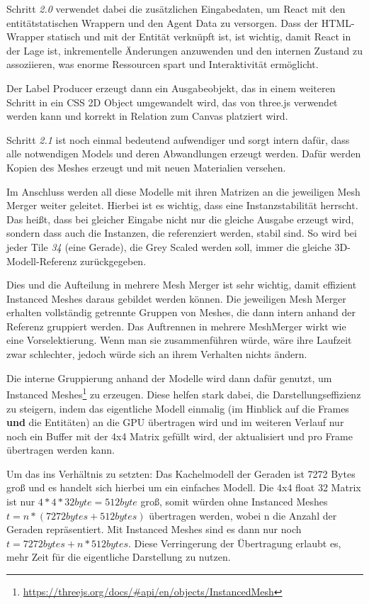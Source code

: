 Schritt \textit{2.0} verwendet dabei die zusätzlichen Eingabedaten, um React mit den entitätstatischen Wrappern und den Agent Data zu versorgen.
Dass der HTML-Wrapper statisch und mit der Entität verknüpft ist, ist wichtig, damit React in der Lage ist, inkrementelle Änderungen anzuwenden und den internen Zustand zu assoziieren, was enorme Ressourcen spart und Interaktivität ermöglicht.

Der Label Producer erzeugt dann ein Ausgabeobjekt, das in einem weiteren Schritt in ein CSS 2D Object umgewandelt wird, das von three.js verwendet werden kann und korrekt in Relation zum Canvas platziert wird.

Schritt \textit{2.1} ist noch einmal bedeutend aufwendiger und sorgt intern dafür, dass alle notwendigen Models und deren Abwandlungen erzeugt werden.
Dafür werden Kopien des Meshes erzeugt und mit neuen Materialien versehen.

Im Anschluss werden all diese Modelle mit ihren Matrizen an die jeweiligen Mesh Merger weiter geleitet.
Hierbei ist es wichtig, dass eine Instanzstabilität herrscht.
Das heißt, dass bei gleicher Eingabe nicht nur die gleiche Ausgabe erzeugt wird, sondern dass auch die Instanzen, die referenziert werden, stabil sind.
So wird bei jeder Tile \textit{34} (eine Gerade), die Grey Scaled werden soll, immer die gleiche 3D-Modell-Referenz zurückgegeben.

Dies und die Aufteilung in mehrere Mesh Merger ist sehr wichtig, damit effizient Instanced Meshes daraus gebildet werden können.
Die jeweiligen Mesh Merger erhalten vollständig getrennte Gruppen von Meshes, die dann intern anhand der Referenz gruppiert werden.
Das Auftrennen in mehrere MeshMerger wirkt wie eine Vorselektierung.
Wenn man sie zusammenführen würde, wäre ihre Laufzeit zwar schlechter, jedoch würde sich an ihrem Verhalten nichts ändern.

Die interne Gruppierung anhand der Modelle wird dann dafür genutzt, um Instanced Meshes\footnote{\url{https://threejs.org/docs/\#api/en/objects/InstancedMesh}} zu erzeugen.
Diese helfen stark dabei, die Darstellungseffizienz zu steigern, indem das eigentliche Modell einmalig (im Hinblick auf die Frames \textbf{und} die Entitäten) an die GPU übertragen wird und im weiteren Verlauf nur noch ein Buffer mit der 4x4 Matrix gefüllt wird, der aktualisiert und pro Frame übertragen werden kann.

Um das ins Verhältnis zu setzten: Das Kachelmodell der Geraden ist 7272 Bytes groß und es handelt sich hierbei um ein einfaches Modell.
Die 4x4 float 32 Matrix ist nur $4*4*32byte=512byte$ groß, somit würden ohne Instanced Meshes $t = n * (7272bytes + 512bytes)$ übertragen werden, wobei n die Anzahl der Geraden repräsentiert.
Mit Instanced Meshes sind es dann nur noch $t = 7272bytes + n * 512bytes$.
Diese Verringerung der Übertragung erlaubt es, mehr Zeit für die eigentliche Darstellung zu nutzen.

